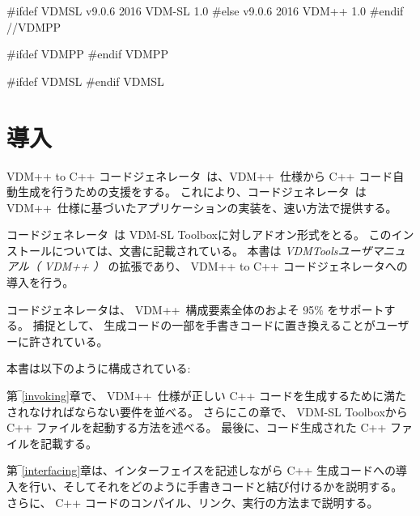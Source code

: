 \documentclass[\pformat,12pt]{jarticle}
\newcommand{\ToolboxName}{VDM-SL Toolbox}
\newcommand{\toolbox}{Toolbox}
\newcommand{\ToolboxName}{VDM++ Toolbox}
\newcommand{\toolbox}{toolbox}
\begin{document}
#ifdef VDMSL
       {v9.0.6}
       {2016}
       {VDM-SL}
       {1.0}
#else
       {v9.0.6}
       {2016}
       {VDM++}
       {1.0}
#endif //VDMPP


\newcommand{\tcg}{コードジェネレータ}
\newcommand{\Tcg}{コードジェネレータ}

#ifdef VDMPP
\newcommand{\libmancite}{\cite{LibMan-CSK}}
\newcommand{\langmancite}{\cite{LangManPP-CSK}}
\newcommand{\VDM}{VDM++}
\newcommand{\cg}{VDM++ to C++ コードジェネレータ}
\newcommand{\MCL}{VDM C++ ライブラリ}
\newcommand{\CGBase}{\texttt{CGBase}}
#endif VDMPP

#ifdef VDMSL
\newcommand{\libmancite}{\cite{LibMan-CSK}}
\newcommand{\langmancite}{\cite{LangMan-CSK}}
\newcommand{\cg}{VDM-SL to C++ Code Generator}
\newcommand{\MCL}{VDM C++ Library}
\newcommand{\VDM}{VDM-SL}
#endif VDMSL


\section{導入}


\cg\ は、\VDM\ 仕様から C++ コード自動生成を行うための支援をする。
これにより、\tcg\ は \VDM\ 仕様に基づいたアプリケーションの実装を、速い方法で提供する。

 \Tcg\ は \ToolboxName{}に対しアドオン形式をとる。
このインストールについては、文書に記載されている。
本書は {\em VDMToolsユーザマニュアル（ \VDM{} ）} の拡張であり、 \cg{}への導入を行う。

コードジェネレータは、 \VDM\ 構成要素全体のおよそ 95\% をサポートする。
捕捉として、 生成コードの一部を手書きコードに置き換えることがユーザーに許されている。

本書は以下のように構成されている:

第‾\ref{invoking}章で、 \VDM\ 仕様が正しい C++ コードを生成するために満たされなければならない要件を並べる。
さらにこの章で、 \ToolboxName{}からC++ ファイルを起動する方法を述べる。
最後に、コード生成された C++ ファイルを記載する。

第‾\ref{interfacing}章は、インターフェイスを記述しながら C++ 生成コードへの導入を行い、そしてそれをどのように手書きコードと結び付けるかを説明する。
さらに、 C++ コードのコンパイル、リンク、実行の方法まで説明する。
\end{document}
